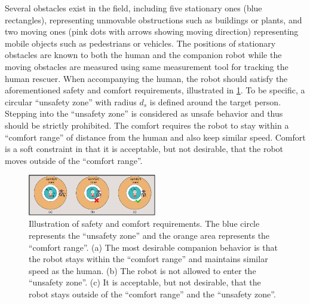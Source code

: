 \documentclass[letterpaper, 10 pt, conference]{ieeeconf}
\begin{document}
	Several obstacles exist in the field, including five stationary ones (blue rectangles), representing unmovable obstructions such as buildings or plants, and two moving ones (pink dots with arrows showing moving direction) representing mobile objects such as pedestrians or vehicles.
	The positions of stationary obstacles are known to both the human and the companion robot while the moving obstacles are measured using same measurement tool for tracking the human rescuer.
	When accompanying the human, the robot should satisfy the aforementioned safety and comfort requirements, illustrated in \cref{fig:zone}.
	To be specific, a circular ``unsafety zone'' with radius $d_s$ is defined around the target person.
	Stepping into the ``unsafety zone'' is considered as unsafe behavior and thus should be strictly prohibited.
	The comfort requires the robot to stay within a ``comfort range'' of  distance from the human and also keep similar speed.
	Comfort is a soft constraint in that it is acceptable, but not desirable, that the robot moves outside of the ``comfort range''.
	
	
	\begin{figure}
		\centering		
		\includegraphics[width=0.5\textwidth]{figures/zone}		
		\caption{Illustration of safety and comfort requirements. The blue circle represents the ``unsafety zone'' and the orange area represents the ``comfort range''. (a) The most desirable companion behavior is that the robot stays within the ``comfort range'' and maintains similar speed as the human. (b) The robot is not allowed to enter the ``unsafety zone''. (c) It is acceptable, but not desirable, that the robot stays outside of the ``comfort range'' and the ``unsafety zone''.}
		\label{fig:zone}
	\end{figure}
	
\end{document}

